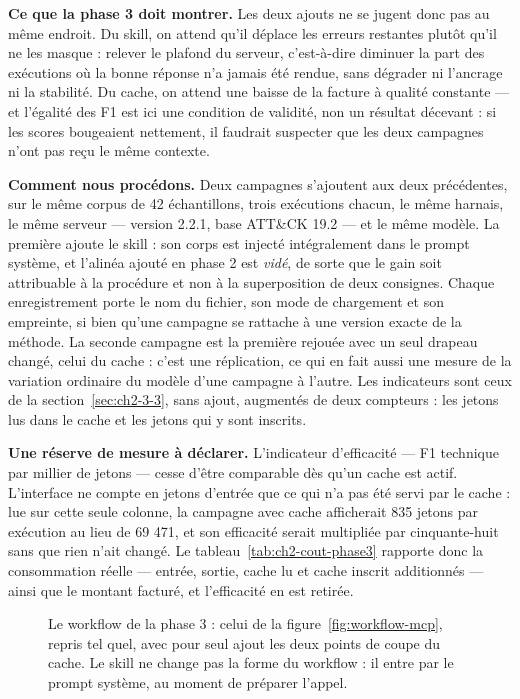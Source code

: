 \textbf{Ce que la phase 3 doit montrer.} Les deux ajouts ne se jugent donc pas au même endroit. Du skill, on attend qu'il déplace les erreurs restantes plutôt qu'il ne les masque : relever le plafond du serveur, c'est-à-dire diminuer la part des exécutions où la bonne réponse n'a jamais été rendue, sans dégrader ni l'ancrage ni la stabilité. Du cache, on attend une baisse de la facture à qualité constante --- et l'égalité des F1 est ici une condition de validité, non un résultat décevant : si les scores bougeaient nettement, il faudrait suspecter que les deux campagnes n'ont pas reçu le même contexte.

\textbf{Comment nous procédons.} Deux campagnes s'ajoutent aux deux précédentes, sur le même corpus de 42 échantillons, trois exécutions chacun, le même harnais, le même serveur --- version 2.2.1, base ATT\&CK 19.2 --- et le même modèle. La première ajoute le skill : son corps est injecté intégralement dans le prompt système, et l'alinéa ajouté en phase 2 est \emph{vidé}, de sorte que le gain soit attribuable à la procédure et non à la superposition de deux consignes. Chaque enregistrement porte le nom du fichier, son mode de chargement et son empreinte, si bien qu'une campagne se rattache à une version exacte de la méthode. La seconde campagne est la première rejouée avec un seul drapeau changé, celui du cache : c'est une réplication, ce qui en fait aussi une mesure de la variation ordinaire du modèle d'une campagne à l'autre. Les indicateurs sont ceux de la section~\ref{sec:ch2-3-3}, sans ajout, augmentés de deux compteurs : les jetons lus dans le cache et les jetons qui y sont inscrits.

\textbf{Une réserve de mesure à déclarer.} L'indicateur d'efficacité --- F1 technique par millier de jetons --- cesse d'être comparable dès qu'un cache est actif. L'interface ne compte en jetons d'entrée que ce qui n'a pas été servi par le cache : lue sur cette seule colonne, la campagne avec cache afficherait 835 jetons par exécution au lieu de 69 471, et son efficacité serait multipliée par cinquante-huit sans que rien n'ait changé. Le tableau~\ref{tab:ch2-cout-phase3} rapporte donc la consommation réelle --- entrée, sortie, cache lu et cache inscrit additionnés --- ainsi que le montant facturé, et l'efficacité en est retirée.

\begin{figure}[htbp]
\centering
{}
\caption{Le workflow de la phase 3 : celui de la figure~\ref{fig:workflow-mcp}, repris tel quel, avec pour seul ajout les deux points de coupe du cache. Le skill ne change pas la forme du workflow : il entre par le prompt système, au moment de préparer l'appel.}\label{fig:workflow-skill-cache}
\end{figure}

